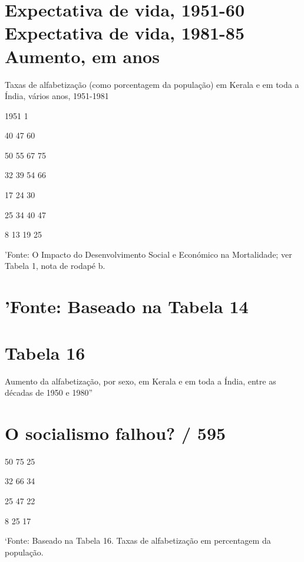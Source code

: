 {{{\section{Expectativa de vida, 1951-60 Expectativa de vida, 1981-85 Aumento, em anos}
 \par 
Taxas de alfabetização (como porcentagem da população) em Kerala e em toda a Índia, vários anos, 1951-1981
 \par 
1951 1%
 \par 
40 {\color{blue}47} {\color{blue}60}
 \par 
50 {\color{blue}55} 67 {\color{blue}75}
 \par 
32 {\color{blue}39} 54 {\color{blue}66}
 \par 
17 {\color{blue}24} {\color{blue}30}
 \par 
25 {\color{blue}34} 40 {\color{blue}47}
 \par 
8 {\color{blue}13} 19 {\color{blue}25}
 \par 
'Fonte: O Impacto do Desenvolvimento Social e Económico na Mortalidade; ver Tabela 1, nota de rodapé b.
 \par 
\section{'Fonte: Baseado na Tabela 14}
 \par 
\section{Tabela 16}
 \par 
Aumento da alfabetização, por sexo, em Kerala e em toda a Índia, entre as décadas de 1950 e 1980”
 \par 
\section{O socialismo falhou? / 595}
 \par 
50 {\color{blue}75} {\color{blue}25}
 \par 
32 {\color{blue}66} {\color{blue}34}
 \par 
25 {\color{blue}47} {\color{blue}22}
 \par 
8 {\color{blue}25} {\color{blue}17}
 \par 
‘Fonte: Baseado na Tabela {\color{blue}16}. Taxas de alfabetização em percentagem da população.
 \par 
}}}
